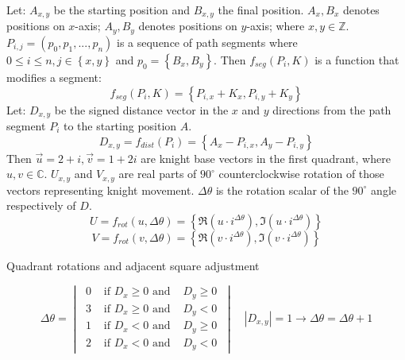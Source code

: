 \documentclass[a4paper, 12pt]{article}
\begin{document}
Let: \( A_{x,y} \) be the starting position and \(B_{x,y}\) the final position. \(A_x, B_x\) denotes positions on \(x\)-axis;
\(A_y, B_y\) denotes positions on \(y\)-axis; where \(x,y \in \mathbb{Z}\). \(P_{i,j} = ( p_0, p_1, ... , p_n)\) is a sequence
of path segments where \(0 \le i \le n, j \in \left\{ x, y\right\}\) and \( p_0 = \left\{ B_x, B_y\right\}\). Then
\( f_{seg}(P_i, K)\) is a function that modifies a segment: 
\[
f_{seg}(P_i, K) = \left\{ P_{i,x} + K_x, P_{i,y} + K_y \right\}
\]
Let: \( D_{x,y} \) be the signed distance vector in the \( x \) and \( y \) directions from the path segment \( P_i \)
to the starting position \( A \).
\[
D_{x,y} = f_{dist}(P_i) = \left\{ A_x - P_{i,x}, A_y - P_{i,y} \right\}
\]
Then \( \overrightarrow{u} = 2 + i, \overrightarrow{v} = 1 + 2i \) are knight base vectors in the first quadrant,
where \(u,v \in \mathbb{C}\). \(U_{x,y}\) and \(V_{x,y}\) are real parts of \(90^{\circ}\) counterclockwise rotation 
of those vectors representing knight movement. \(\Delta\theta\) is the rotation scalar of the \(90^{\circ}\) angle 
respectively of \(D\).  \\
\[
U = f_{rot}(u, \Delta\theta) = \left\{ \Re(u \cdot i^{\Delta\theta}), \Im(u \cdot i^{\Delta\theta}) \right\}
\]
\vspace{-1em}
\[
V = f_{rot}(v, \Delta\theta) = \left\{ \Re(v \cdot i^{\Delta\theta}), \Im(v \cdot i^{\Delta\theta}) \right\}
\]
\begin{center}
Quadrant rotations and adjacent square adjustment
\end{center}
\vspace{0.5em}
\[
\Delta \theta =
\begin{vmatrix}
\ 0 & \text{ if }D_{x} \ge 0 \text{ and } & D_{y} \ge 0 \ \\
\ 3 & \text{ if }D_{x} \ge 0 \text{ and } & D_{y} < 0   \ \\
\ 1 & \text{ if }D_{x} < 0   \text{ and } & D_{y} \ge 0 \ \\
\ 2 & \text{ if }D_{x} < 0   \text{ and } & D_{y} < 0   \ 
\end{vmatrix}
\hspace{1em}
|D_{x,y}| = 1 \to \Delta\theta = \Delta\theta + 1
\]
\newpage

\end{document}
